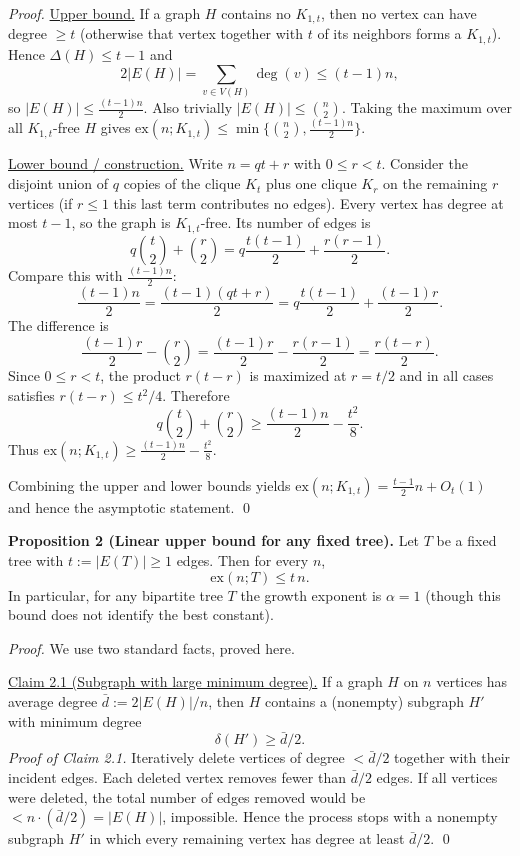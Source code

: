 \emph{Proof.}
\underline{Upper bound.}
If a graph $H$ contains no $K_{1,t}$, then no vertex can have degree $\ge t$ (otherwise that vertex together with $t$ of its neighbors forms a $K_{1,t}$). Hence $\Delta(H)\le t-1$ and
\[
2|E(H)|=\sum_{v\in V(H)} \deg(v) \le (t-1)n,
\]
so $|E(H)|\le \frac{(t-1)n}{2}$. Also trivially $|E(H)|\le \binom{n}{2}$. Taking the maximum over all $K_{1,t}$-free $H$ gives
\(\mathrm{ex}(n;K_{1,t})\le \min\{\binom{n}{2},\frac{(t-1)n}{2}\}.\)

\underline{Lower bound / construction.}
Write $n=qt+r$ with $0\le r<t$. Consider the disjoint union of $q$ copies of the clique $K_t$ plus one clique $K_r$ on the remaining $r$ vertices (if $r\le 1$ this last term contributes no edges). Every vertex has degree at most $t-1$, so the graph is $K_{1,t}$-free.
Its number of edges is
\[
q\binom{t}{2}+\binom{r}{2} = q\frac{t(t-1)}{2}+\frac{r(r-1)}{2}.
\]
Compare this with $\frac{(t-1)n}{2}$:
\[
\frac{(t-1)n}{2}=\frac{(t-1)(qt+r)}{2}=q\frac{t(t-1)}{2}+\frac{(t-1)r}{2}.
\]
The difference is
\[
\frac{(t-1)r}{2}-\binom{r}{2}=\frac{(t-1)r}{2}-\frac{r(r-1)}{2}=\frac{r(t-r)}{2}.
\]
Since $0\le r<t$, the product $r(t-r)$ is maximized at $r=t/2$ and in all cases satisfies $r(t-r)\le t^2/4$. Therefore
\[
q\binom{t}{2}+\binom{r}{2} \ge \frac{(t-1)n}{2}-\frac{t^2}{8}.
\]
Thus $\mathrm{ex}(n;K_{1,t})\ge \frac{(t-1)n}{2}-\frac{t^2}{8}$.

Combining the upper and lower bounds yields $\mathrm{ex}(n;K_{1,t})=\frac{t-1}{2}n+O_t(1)$ and hence the asymptotic statement.
\qed

\medskip
\textbf{Proposition 2 (Linear upper bound for any fixed tree).}
Let $T$ be a fixed tree with $t:=|E(T)|\ge 1$ edges. Then for every $n$,
\[
\mathrm{ex}(n;T) \le t\,n.
\]
In particular, for any bipartite tree $T$ the growth exponent is $\alpha=1$ (though this bound does not identify the best constant).

\emph{Proof.}
We use two standard facts, proved here.

\underline{Claim 2.1 (Subgraph with large minimum degree).}
If a graph $H$ on $n$ vertices has average degree $\bar d:=2|E(H)|/n$, then $H$ contains a (nonempty) subgraph $H'$ with minimum degree
\[
\delta(H')\ge \bar d/2.
\]
\emph{Proof of Claim 2.1.}
Iteratively delete vertices of degree $<\bar d/2$ together with their incident edges. Each deleted vertex removes fewer than $\bar d/2$ edges. If all vertices were deleted, the total number of edges removed would be $< n\cdot(\bar d/2)=|E(H)|$, impossible. Hence the process stops with a nonempty subgraph $H'$ in which every remaining vertex has degree at least $\bar d/2$.
\qed

